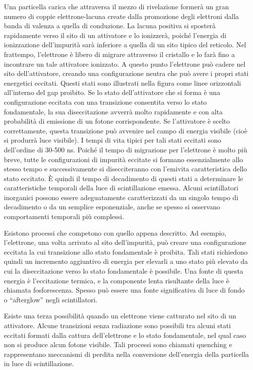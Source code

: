 Una particella carica che attraversa il mezzo di rivelazione formerà un gran numero di coppie elettrone-lacuna create dalla promozione degli elettroni dalla banda di valenza a quella di conduzione. La lacuna positiva si sposterà rapidamente verso il sito di un attivatore e lo ionizzerà, poiché l'energia di ionizzazione dell'impurità sarà inferiore a quella di un sito tipico del reticolo. Nel frattempo, l'elettrone è libero di migrare attraverso il cristallo e lo farà fino a incontrare un tale attivatore ionizzato. A questo punto l'elettrone può cadere nel sito dell'attivatore, creando una configurazione neutra che può avere i propri stati energetici eccitati. Questi stati sono illustrati nella figura come linee orizzontali all'interno del gap proibito. Se lo stato dell'attivatore che si forma è una configurazione eccitata con una transizione consentita verso lo stato fondamentale, la sua diseccitazione avverrà molto rapidamente e con alta probabilità di emissione di un fotone corrispondente. Se l'attivatore è scelto correttamente, questa transizione può avvenire nel campo di energia visibile (cioè si produrrà luce visibile). I tempi di vita tipici per tali stati eccitati sono dell'ordine di 30-500 ns. Poiché il tempo di migrazione per l'elettrone è molto più breve, tutte le configurazioni di impurità eccitate si formano essenzialmente allo stesso tempo e successivamente si disecciteranno con l'emivita caratteristica dello stato eccitato. È quindi il tempo di decadimento di questi stati a determinare le caratteristiche temporali della luce di scintillazione emessa. Alcuni scintillatori inorganici possono essere adeguatamente caratterizzati da un singolo tempo di decadimento o da un semplice esponenziale, anche se spesso si osservano comportamenti temporali più complessi.

Esistono processi che competono con quello appena descritto. Ad esempio, l'elettrone, una volta arrivato al sito dell'impurità, può creare una configurazione eccitata la cui transizione allo stato fondamentale è proibita. Tali stati richiedono quindi un incremento aggiuntivo di energia per elevarli a uno stato più elevato da cui la diseccitazione verso lo stato fondamentale è possibile. Una fonte di questa energia è l'eccitazione termica, e la componente lenta risultante della luce è chiamata fosforescenza. Spesso può essere una fonte significativa di luce di fondo o ``afterglow'' negli scintillatori.

Esiste una terza possibilità quando un elettrone viene catturato nel sito di un attivatore. Alcune transizioni senza radiazione sono possibili tra alcuni stati eccitati formati dalla cattura dell'elettrone e lo stato fondamentale, nel qual caso non si produce alcun fotone visibile. Tali processi sono chiamati quenching e rappresentano meccanismi di perdita nella conversione dell'energia della particella in luce di scintillazione.

